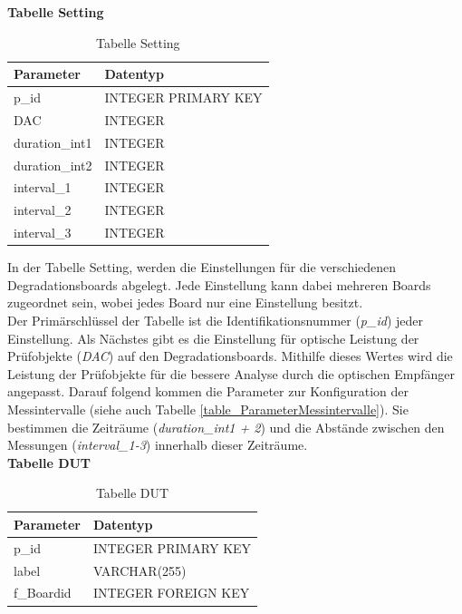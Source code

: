 \newpage

\textbf{Tabelle Setting}\\

\begin{table}[H]
\begin{center}
\begin{tabular}{|l|l|}\hline
Parameter & Datentyp \\ \hline
p\_id & INTEGER PRIMARY KEY\\ 
DAC & INTEGER\\ 
duration\_int1 & INTEGER\\ 
duration\_int2 & INTEGER\\ 
interval\_1 & INTEGER\\ 
interval\_2 & INTEGER\\ 
interval\_3 & INTEGER\\ \hline
\end{tabular}
\caption{Tabelle Setting}
\label{table_TabelleSetting}
\end{center}
\end{table}

In der Tabelle Setting, werden die Einstellungen  für die verschiedenen Degradationsboards abgelegt. Jede Einstellung kann dabei mehreren Boards zugeordnet sein, wobei jedes Board nur eine Einstellung besitzt.\\
Der Primärschlüssel der Tabelle ist die Identifikationsnummer (\textit{p\_id}) jeder Einstellung. Als Nächstes gibt es die Einstellung für optische Leistung der Prüfobjekte (\textit{DAC}) auf den Degradationsboards. Mithilfe dieses Wertes wird die Leistung der Prüfobjekte für die bessere Analyse durch die optischen Empfänger angepasst. Darauf folgend kommen die Parameter zur Konfiguration der Messintervalle (siehe auch Tabelle \ref{table_ParameterMessintervalle}). Sie bestimmen die Zeiträume (\textit{duration\_int1 + 2}) und die Abstände zwischen den Messungen (\textit{interval\_1-3}) innerhalb dieser Zeiträume.\\

\textbf{Tabelle DUT}\\

\begin{table}[H]
\begin{center}
\begin{tabular}{|l|l|}\hline
Parameter & Datentyp \\ \hline
p\_id & INTEGER PRIMARY KEY\\ 
label & VARCHAR(255)\\ 
f\_Boardid & INTEGER FOREIGN KEY\\ \hline
\end{tabular}
\caption{Tabelle DUT}
\label{table_TabelleDUT}
\end{center}
\end{table}

